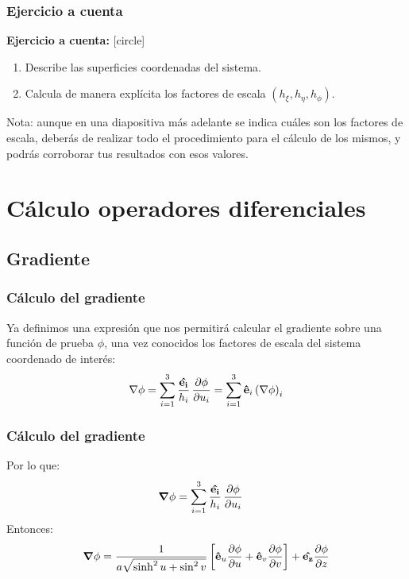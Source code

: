 \documentclass[12pt]{beamer}
\begin{document}
\begin{frame}
\frametitle{Ejercicio a cuenta}
\textbf{Ejercicio a cuenta: } 
[circle]
\begin{enumerate}
\item Describe las superficies coordenadas del sistema.
\item Calcula de manera explícita los factores de escala $(h_{\xi}, h_{\eta}, h_{\phi})$.
\end{enumerate}
Nota: aunque en una diapositiva más adelante se indica cuáles son los factores de escala, deberás de realizar todo el procedimiento para el cálculo de los mismos, y podrás corroborar tus resultados con esos valores.
\end{frame}
\section{Cálculo operadores diferenciales}
\subsection{Gradiente}
\begin{frame}
\frametitle{Cálculo del gradiente}
Ya definimos una expresión que nos permitirá calcular el gradiente sobre una función de prueba $\phi$, una vez conocidos los factores de escala del sistema coordenado de interés:
\begin{align*}
\nabla{\phi} = \sum_{i=1}^{3} \dfrac{\vu{e_{i}}}{h_{i}} \, \pdv{\phi}{u_{i}} = \sum_{i=1}^{3} \vu{e}_{i} \left( \nabla{\phi} \right)_{i}
\end{align*}
\end{frame}
\begin{frame}
\frametitle{Cálculo del gradiente}
Por lo que: 
\begin{align*}
\grad{\phi} &= \sum_{i=1}^{3} \dfrac{\vu{e_{i}}}{h_{i}} \, \pdv{\phi}{u_{i}}
\end{align*}
\pause
Entonces:
\begin{align*}
\grad{\phi} = \dfrac{1}{a \sqrt{\sinh^{2} u + \sin^{2} v}} \left[ \vu{e}_{u} \pdv{\phi}{u} + \vu{e}_{v} \pdv{\phi}{v} \right] + \vu{e_{z}} \pdv{\phi}{z}
\end{align*}
\end{frame}
\end{document}
